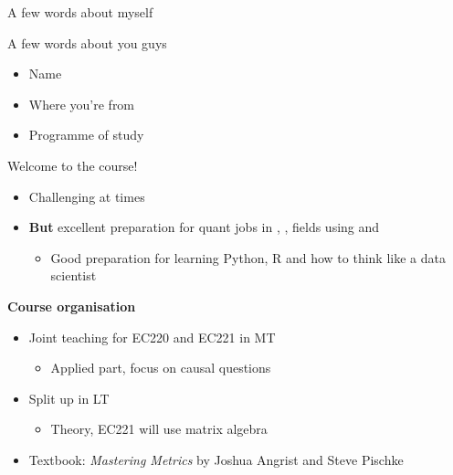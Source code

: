 \documentclass[aspectratio=169, 11pt]{beamer}
\begin{document}
\begin{frame}{A few words about myself}
\end{frame}

\begin{frame}{A few words about you guys}
    
    \begin{itemize}
        \item Name
        \item Where you're from
        \item Programme of study
    \end{itemize}
\end{frame}

\begin{frame}{Welcome to the course!}

    \begin{itemize}
        \item Challenging at times
        \item \textbf{But} excellent preparation for quant jobs in , , fields using  and 
        \begin{itemize}
            \item Good preparation for learning Python, R and how to think like a data scientist
        \end{itemize}
    \end{itemize}
    
    \vspace{0.5cm}
    \textbf{Course organisation}
    \begin{itemize}[<+- | alert@+>]
        \item Joint teaching for EC220 and EC221 in MT
        \begin{itemize}
            \item Applied part, focus on causal questions
        \end{itemize}
        \item Split up in LT
        \begin{itemize}
            \item Theory, EC221 will use matrix algebra
        \end{itemize}
        \item Textbook: \textit{Mastering Metrics} by Joshua Angrist and Steve Pischke
    \end{itemize}

\end{frame}
\end{document}
